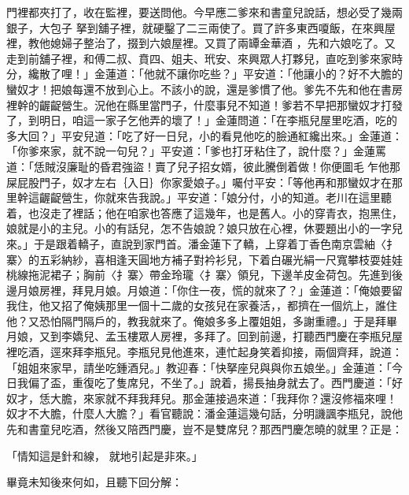 \begin{showcontents}{}
門裡都夾打了，收在監裡，要送問他。今早應二爹來和書童兒說話，想必受了幾兩銀子，大包子 拏到舖子裡，就硬鑿了二三兩使了。買了許多東西嗄飯，在來興屋裡，教他媳婦子整治了，掇到六娘屋裡。又買了兩罈金華酒 ，先和六娘吃了。又走到前舖子裡，和傅二叔、賁四、姐夫、玳安、來興眾人打夥兒，直吃到爹來家時分，纔散了哩！」金蓮道：「他就不讓你吃些？」平安道：「他讓小的？好不大膽的蠻奴才！把娘每還不放到心上。不該小的說，還是爹慣了他。爹先不先和他在書房裡幹的齷齪營生。況他在縣里當門子，什麼事兒不知道！爹若不早把那蠻奴才打發了，到明日，咱這一家子乞他弄的壞了！」金蓮問道：「在李瓶兒屋里吃酒，吃的多大回？」平安兒道：「吃了好一日兒，小的看見他吃的臉通紅纔出來。」金蓮道：「你爹來家，就不說一句兒？」平安道：「爹也打牙粘住了，說什麼？」金蓮罵道：「恁賊沒廉耻的昏君強盜！賣了兒子招女婿，彼此騰倒着做！你便圖毛乍他那屎屁股門子，奴才左右｛入日｝你家愛娘子。」囑付平安：「等他再和那蠻奴才在那里幹這齷齪營生，你就來告我說。」平安道：「娘分付，小的知道。老川在這里聽着，也沒走了裡話；他在咱家也答應了這幾年，也是舊人。小的穿青衣，抱黑住，娘就是小的主兒。小的有話兒，怎不告娘說？娘只放在心裡，休要題出小的一字兒來。」于是跟着轎子，直說到家門首。潘金蓮下了轎，上穿着丁香色南京雲紬〈扌寨〉的五彩納紗，喜相逢天圓地方補子對衿衫兒，下着白碾光絹一尺寬攀枝耍娃娃桃線拖泥裙子；胸前〈扌寨〉帶金玲瓏〈扌寨〉領兒，下邊羊皮金荷包。先進到後邊月娘房裡，拜見月娘。月娘道：「你住一夜，慌的就來了？」金蓮道：「俺娘要留我住，他又招了俺姨那里一個十二歲的女孩兒在家養活，，都擠在一個炕上，誰住他？又恐怕隔門隔戶的，教我就來了。俺娘多多上覆姐姐，多謝重禮。」于是拜畢月娘，又到李嬌兒、孟玉樓眾人房裡，多拜了。回到前邊，打聽西門慶在李瓶兒屋裡吃酒，逕來拜李瓶兒。李瓶兒見他進來，連忙起身笑着抑接，兩個齊拜，說道：「姐姐來家早，請坐吃鍾酒兒。」教迎春：「快拏座兒與與你五娘坐。」金蓮道：「今日我偏了盃，重復吃了隻席兒，不坐了。」說着，揚長抽身就去了。西門慶道：「好奴才，恁大膽，來家就不拜我拜兒。那金蓮接過來道：「我拜你？還沒修福來哩！奴才不大膽，什麼人大膽？」看官聽說：潘金蓮這幾句話，分明譏諷李瓶兒，說他先和書童兒吃酒，然後又陪西門慶，豈不是雙席兒？那西門慶怎曉的就里？正是：

「情知這是針和線，  就地引起是非來。」

畢竟未知後來何如，且聽下回分解：






\end{showcontents}


